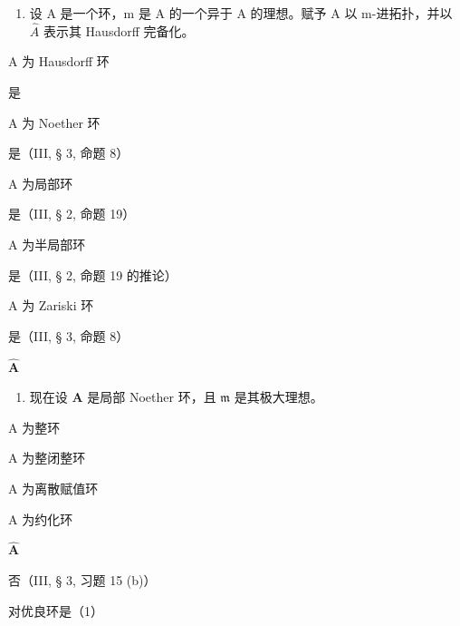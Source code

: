 
\begin{enumerate}
\def\labelenumi{(\alph{enumi})}
\tightlist
\item
  设 A 是一个环，m 是 A 的一个异于 A 的理想。赋予 A 以 m-进拓扑，并以 \(\hat{A}\) 表示其 Hausdorff 完备化。
\end{enumerate}

A 为 Hausdorff 环

是

A 为 Noether 环

是（III, § 3, 命题 8）

A 为局部环

是（III, § 2, 命题 19）

A 为半局部环

是（III, § 2, 命题 19 的推论）

A 为 Zariski 环

是（III, § 3, 命题 8）

\textbf{\(\hat{\mathbf{A}}\)}\par

\begin{enumerate}
\def\labelenumi{(\alph{enumi})}
\setcounter{enumi}{1}
\tightlist
\item
  现在设 \(\mathbf{A}\) 是局部 Noether 环，且 \(\mathfrak{m}\) 是其极大理想。
\end{enumerate}

A 为整环

A 为整闭整环

A 为离散赋值环

A 为约化环

\textbf{\(\hat{\mathbf{A}}\)}\par

否（III, § 3, 习题 15 (b)）

对优良环是（1）


